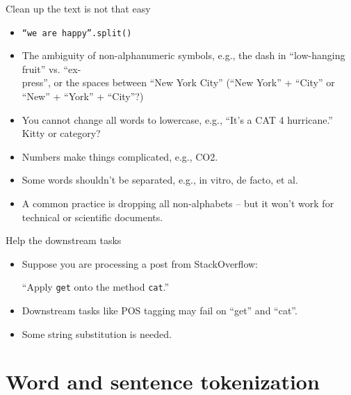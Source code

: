 \documentclass[11pt]{beamer}
\begin{document}
\begin{frame}{Clean up the text is not that easy}
 \begin{itemize}
  \item \texttt{``we are happy''.split()} 
  \item The ambiguity of non-alphanumeric symbols, e.g., the dash in ``low-hanging fruit'' vs. ``ex-\\press'', or the spaces between ``New York City'' (``New York'' + ``City'' or ``New'' + ``York'' + ``City''?)
  \item You cannot change all words to lowercase, e.g., ``It's a CAT 4 hurricane.'' Kitty or category? 
  \item Numbers make things complicated, e.g., CO2. 
  \item Some words shouldn't be separated, e.g., in vitro, de facto, et al. 
  \item A common practice is dropping all non-alphabets -- but it won't work for technical or scientific documents. 
 \end{itemize}
\end{frame}

\begin{frame}{Help the downstream tasks}
 \begin{itemize}[<+->]
  \item Suppose you are processing a post from StackOverflow: 
  
``Apply \texttt{get} onto the method \texttt{cat}.'' 

 \item Downstream tasks like POS tagging may fail on ``get'' and ``cat''. 
 
 \item Some string substitution is needed. 
 \end{itemize}
\end{frame}


\section{Word and sentence tokenization}
\end{document}
